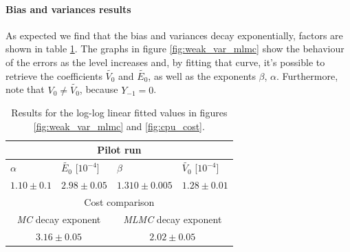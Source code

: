 \paragraph{Bias and variances results}
As expected we find that the bias and variances decay exponentially, factors are shown in table \ref{tab:mlmc_results}.  The graphs in figure \ref{fig:weak_var_mlmc} show  the behaviour of the errors as the level increases and, by fitting that curve, it's possible to retrieve the coefficients $\tilde{V_0}$ and $\tilde{E_0}$, as well as the exponents $\beta$, $\alpha$. Furthermore, note that $V_0 \neq \tilde{V_0}$, because $Y_{-1} = 0$.


\begin{table}[h]
\begin{tabular}{ |p{3cm}|p{3cm}|p{3cm}|p{3cm}|  }
\hline
\multicolumn{4}{|c|}{Pilot run} \\
\hline
$\alpha$ & $\tilde{E_0}$ [$10^{-4}$] & $\beta$ & $\tilde{V_0}$ [$10^{-4}$] \\
$1.10 \pm 0.1$ & $2.98 \pm 0.05$ & $1.310 \pm 0.005$ & $1.28 \pm 0.01$ \\
\hline
\multicolumn{4}{|c|}{Cost comparison} \\
\hline
\multicolumn{2}{|c|}{\textit{MC} decay exponent} & \multicolumn{2}{|c|}{\textit{MLMC} decay exponent} \\
\multicolumn{2}{|c|}{$3.16 \pm 0.05$} & 
\multicolumn{2}{|c|}{$2.02 \pm 0.05$} \\
\hline
\end{tabular}
\caption{Results for the log-log linear fitted values in figures \ref{fig:weak_var_mlmc} and \ref{fig:cpu_cost}.}
\label{tab:mlmc_results}
\end{table}

